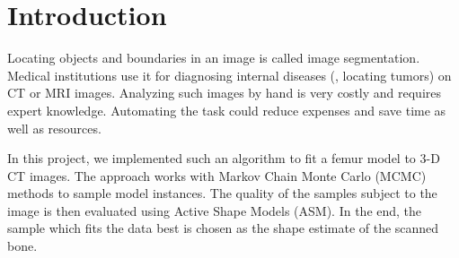 \section{Introduction}
\label{sec:intro}

Locating objects and boundaries in an image is called image segmentation.
Medical institutions use it for diagnosing internal diseases (\eg, locating tumors) on CT or MRI images.
Analyzing such images by hand is very costly and requires expert knowledge.
Automating the task could reduce expenses and save time as well as resources.

In this project, we implemented such an algorithm to fit a femur model to 3-D CT images.
The approach works with Markov Chain Monte Carlo (MCMC) methods to sample model instances.
The quality of the samples subject to the image is then evaluated using Active Shape Models (ASM).
In the end, the sample which fits the data best is chosen as the shape estimate of the scanned bone.
